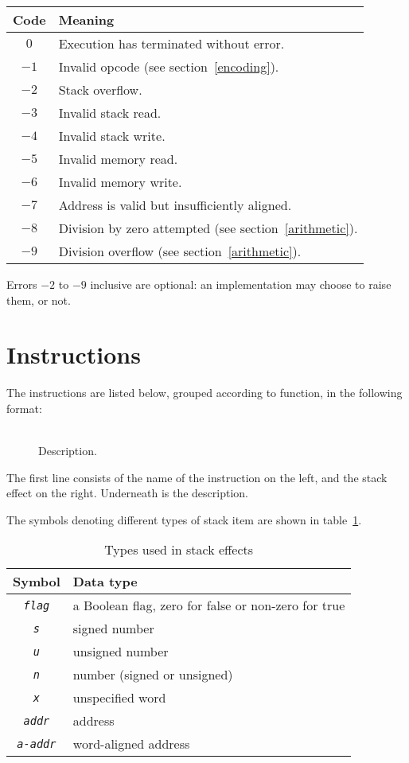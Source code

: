 \documentclass[a4paper]{article}
\newcommand{\spic}[1]{\texttt{\textsl{#1\/}}}
\newlength{\itemwidth}\itemwidth=\textwidth \advance\itemwidth by -0.1in
\newlength{\instname}\instname=0.8in
\newlength{\stackcom}\stackcom=3.7in
\newcommand{\inst}[3]{\item[]\parbox{\itemwidth}%
{\makebox[\instname][l]{\tt #1}%
\makebox[\stackcom][r]{\spic{#2}}\\[0.5ex]#3}}
\begin{document}
\begin{center}
\begin{tabular}{cp{4in}} \toprule
\bf Code & \bf Meaning \\ \midrule
$0$ & Execution has terminated without error. \\
$-1$ & Invalid opcode (see section~\ref{encoding}). \\
$-2$ & Stack overflow. \\
$-3$ & Invalid stack read. \\
$-4$ & Invalid stack write. \\
$-5$ & Invalid memory read. \\
$-6$ & Invalid memory write. \\
$-7$ & Address is valid but insufficiently aligned. \\
$-8$ & Division by zero attempted (see section~\ref{arithmetic}). \\
$-9$ & Division overflow (see section~\ref{arithmetic}). \\
 \bottomrule
\end{tabular}
\end{center}

\noindent Errors $-2$ to $-9$ inclusive are optional: an implementation may choose to raise them, or not.


\section{Instructions}

The instructions are listed below, grouped according to function, in the following format:

\begin{description}
\inst{NAME}{before → after}{Description.}
\end{description}

The first line consists of the name of the instruction on the left, and the stack effect on the right. Underneath is the description.

The symbols denoting different types of stack item are shown in table~\ref{typetable}.

\begin{table}[htbp]
\begin{center}
\begin{tabular}{cl} \toprule
\bf Symbol & \bf Data type \\ \midrule
\spic{flag} & a Boolean flag, zero for false or non-zero for true \\
\spic{s} & signed number \\
\spic{u} & unsigned number \\
\spic{n} & number (signed or unsigned) \\
\spic{x} & unspecified word \\
\spic{addr} & address \\
\spic{a-addr} & word-aligned address \\
\bottomrule
\end{tabular}
\caption{\label{typetable}Types used in stack effects}
\end{center}
\end{table}
\end{document}
